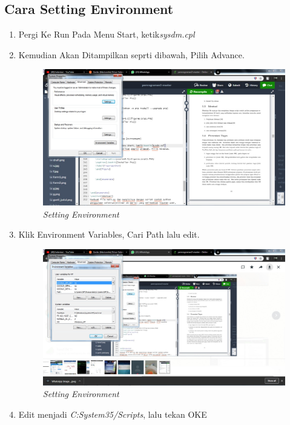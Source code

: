 \subsection{Cara Setting Environment}
\begin{enumerate}
\item Pergi Ke Run Pada Menu Start, ketik\textit{sysdm.cpl}
\item Kemudian Akan Ditampilkan seprti dibawah, Pilih Advance. 
    \begin{figure}[!htbp]
    \centering
    \includegraphics[scale=0.2]{figures/21.PNG}
    \caption{\textit{Setting Environment}}
    \label{Figurepython}
    \end{figure}
\item Klik Environment Variables, Cari Path lalu edit.
\begin{figure}[!htbp]
    \centering
    \includegraphics[scale=0.3]{figures/22.PNG}
    \caption{\textit{Setting Environment}}
    \label{Figurepython}
    \end{figure}
\item Edit menjadi \textit{C:System35/Scripts}, lalu tekan OKE

\end{enumerate}
